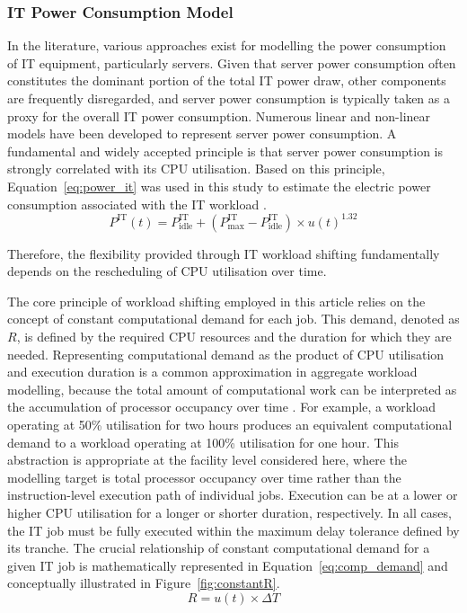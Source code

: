 \documentclass[lettersize,journal]{IEEEtran}
\begin{document}
\subsubsection{IT Power Consumption Model}

 In the literature, various approaches exist for modelling the power consumption of IT equipment, particularly servers. Given that server power consumption often constitutes the dominant portion of the total IT power draw, other components are frequently disregarded, and server power consumption is typically taken as a proxy for the overall IT power consumption. Numerous linear and non-linear models have been developed to represent server power consumption. A fundamental and widely accepted principle is that server power consumption is strongly correlated with its CPU utilisation. Based on this principle, Equation~\eqref{eq:power_it} was used in this study to estimate the electric power consumption associated with the IT workload \cite{dayarathna2015data,v2015analysis}.
\begin{equation}
P^{\mathrm{IT}}(t) = P^{\mathrm{IT}}_{\mathrm{idle}} + (P^{\mathrm{IT}}_{\mathrm{max}} - P^{\mathrm{IT}}_{\mathrm{idle}}) \times u(t)^{1.32}
\label{eq:power_it}
\end{equation}



Therefore, the flexibility provided through IT workload shifting fundamentally depends on the rescheduling of CPU utilisation over time.

The core principle of workload shifting employed in this article relies on the concept of constant computational demand for each job. This demand, denoted as $R$, is defined by the required CPU resources and the duration for which they are needed. Representing computational demand as the product of CPU utilisation and execution duration is a common approximation in aggregate workload modelling, because the total amount of computational work can be interpreted as the accumulation of processor occupancy over time \cite{dayarathna2015data,6779441,Cao2022ApEn}. For example, a workload operating at 50\% utilisation for two hours produces an equivalent computational demand to a workload operating at 100\% utilisation for one hour. This abstraction is appropriate at the facility level considered here, where the modelling target is total processor occupancy over time rather than the instruction-level execution path of individual jobs. Execution can be at a lower or higher CPU utilisation for a longer or shorter duration, respectively. In all cases, the IT job must be fully executed within the maximum delay tolerance defined by its tranche. The crucial relationship of constant computational demand for a given IT job is mathematically represented in Equation~\eqref{eq:comp_demand} and conceptually illustrated in Figure~\ref{fig:constantR}.
\begin{equation}
R = u(t) \times \Delta T
\label{eq:comp_demand}
\end{equation}
\end{document}
